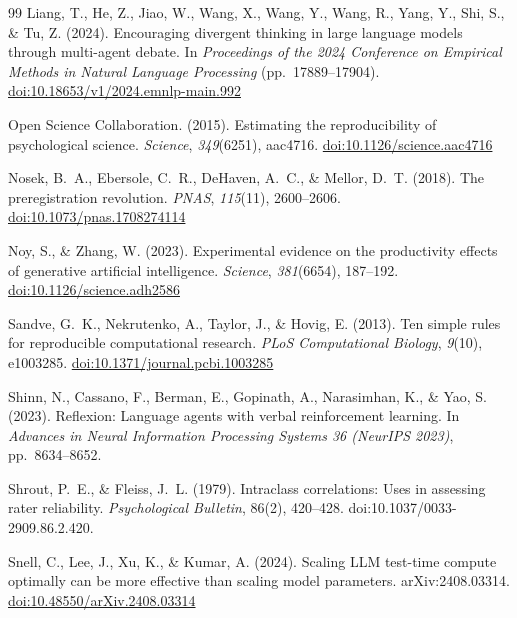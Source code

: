 \documentclass[12pt,a4paper]{article}
\begin{document}
\begin{thebibliography}{99}
Liang, T., He, Z., Jiao, W., Wang, X., Wang, Y., Wang, R., Yang, Y., Shi, S.,
  \& Tu, Z. (2024).
Encouraging divergent thinking in large language models through multi-agent
  debate.
In \textit{Proceedings of the 2024 Conference on Empirical Methods in Natural
  Language Processing} (pp.~17889--17904).
\href{https://doi.org/10.18653/v1/2024.emnlp-main.992}{doi:10.18653/v1/2024.emnlp-main.992}

Open Science Collaboration. (2015).
Estimating the reproducibility of psychological science.
\textit{Science}, \textit{349}(6251), aac4716.
\href{https://doi.org/10.1126/science.aac4716}{doi:10.1126/science.aac4716}

Nosek, B.~A., Ebersole, C.~R., DeHaven, A.~C., \& Mellor, D.~T. (2018).
The preregistration revolution.
\textit{PNAS}, \textit{115}(11), 2600--2606.
\href{https://doi.org/10.1073/pnas.1708274114}{doi:10.1073/pnas.1708274114}

Noy, S., \& Zhang, W. (2023).
Experimental evidence on the productivity effects of generative artificial
  intelligence.
\textit{Science}, \textit{381}(6654), 187--192.
\href{https://doi.org/10.1126/science.adh2586}{doi:10.1126/science.adh2586}

Sandve, G.~K., Nekrutenko, A., Taylor, J., \& Hovig, E. (2013).
Ten simple rules for reproducible computational research.
\textit{PLoS Computational Biology}, \textit{9}(10), e1003285.
\href{https://doi.org/10.1371/journal.pcbi.1003285}{doi:10.1371/journal.pcbi.1003285}

Shinn, N., Cassano, F., Berman, E., Gopinath, A., Narasimhan, K., \& Yao, S.
  (2023).
Reflexion: Language agents with verbal reinforcement learning.
In \textit{Advances in Neural Information Processing Systems 36 (NeurIPS 2023)},
  pp.~8634--8652.

Shrout, P.~E., \& Fleiss, J.~L. (1979). Intraclass correlations: Uses in
assessing rater reliability. \emph{Psychological Bulletin}, 86(2), 420--428.
doi:10.1037/0033-2909.86.2.420.

Snell, C., Lee, J., Xu, K., \& Kumar, A. (2024).
Scaling LLM test-time compute optimally can be more effective than scaling model
  parameters.
arXiv:2408.03314.
\href{https://doi.org/10.48550/arXiv.2408.03314}{doi:10.48550/arXiv.2408.03314}


\end{thebibliography}
\end{document}
